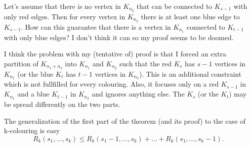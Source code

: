 Let's assume that there is no vertex in $K_{n_2}$ that can be connected to $K_{s-1}$ with only red edges.
Then for every vertex in $K_{n_2}$ there is at least one blue edge to $K_{s-1}$.
How can this guarantee that there is a vertex in $K_{n_1}$ connected to $K_{t-1}$ with only blue edges?
I don't think it can so my proof seems to be doomed.

I think the problem with my (tentative of) proof is that I forced an extra partition of $K_{n_1+n_2}$ into $K_{n_1}$ and $K_{n_2}$
such that the red $K_s$ has $s-1$ vertices in $K_{n_1}$ (or the blue $K_t$ has $t-1$ vertices in $K_{n_2}$).
This is an additional constraint which is not fullfilled for every colouring.
Also, it focuses only on a red $K_{s-1}$ in $K_{n_1}$ and a blue $K_{t-1}$ in $K_{n_2}$ and ignores anything else.
The $K_s$ (or the $K_t$) may be spread differently on the two parts.

\medskip

The generalization of the first part of the theorem (and its proof) to the case of k-colouring is easy
\begin{equation}
    \label{eq:generalRamseyUpperBound}
    R_k(s_1,\dots,s_k) \leq R_k(s_1-1,\dots,s_k) + \dots + R_k(s_1,\dots,s_k-1) .
\end{equation}

